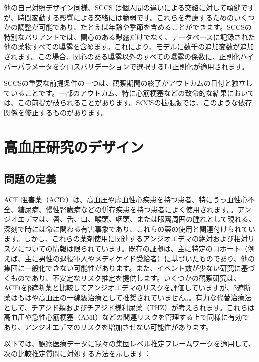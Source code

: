\documentclass[
  11pt]{book}
\theoremstyle{definition}
\theoremstyle{definition}
\theoremstyle{definition}
\theoremstyle{definition}
\theoremstyle{remark}
\begin{document}
他の自己対照デザイン同様、SCCS は個人間の違いによる交絡に対して頑健ですが、時間変動する影響による交絡には脆弱です。これらを考慮するためのいくつかの調整が可能であり、たとえば年齢や季節を含めることができます。SCCSの特別なバリアントでは、関心のある曝露だけでなく、データベースに記録された他の薬物すべての曝露を含めます\citep{simpson_2013}。これにより、モデルに数千の追加変数が追加されます。この場合、関心のある曝露以外のすべての曝露の係数に、正則化ハイパーパラメータをクロスバリデーションで選択するL1正則化が適用されます。

SCCSの重要な前提条件の一つは、観察期間の終了がアウトカムの日付と独立していることです。一部のアウトカム、特に心筋梗塞などの致命的な結果においては、この前提が破られることがあります。SCCSの拡張版では、このような依存関係を修正するものがあります\citep{farrington_2011}。

\section{高血圧研究のデザイン}\label{ux9ad8ux8840ux5727ux7814ux7a76ux306eux30c7ux30b6ux30a4ux30f3}

\subsection{問題の定義}\label{ux554fux984cux306eux5b9aux7fa9-1}

ACE 阻害薬（ACEi）は、高血圧や虚血性心疾患を持つ患者、特にうっ血性心不全、糖尿病、慢性腎臓病などの併存疾患を持つ患者によく使用されます。\citep{zaman_2002}。アンジオエデマは、唇、舌、口、喉頭、咽頭、または眼窩周囲の腫れとして現れる、深刻で時には命に関わる有害事象であり、これらの薬の使用と関連付けられています。\citep{sabroe_1997}しかし、これらの薬剤使用に関連するアンジオエデマの絶対および相対リスクについての情報は限られています。既存の証拠は、主に特定のコホート（例えば、主に男性の退役軍人やメディケイド受給者）に基づいたものであり、他の集団に一般化できない可能性があります。また、イベント数が少ない研究に基づくものであり、不安定なリスク推定を提供します。\citep{powers_2012}いくつかの観察研究は、ACEiをβ遮断薬と比較してアンジオエデマのリスクを評価しています\citep{magid_2010, toh_2012}が、β遮断薬はもはや高血圧の一線級治療として推奨されていません。\citep{whelton_2018}。有力な代替治療法として、チアジド類およびチアジド様利尿薬（THZ）が考えられます。これらは高血圧や急性心筋梗塞（AMI）などの関連リスクを管理する上で同様に有効であり、アンジオエデマのリスクを増加させない可能性があります。

以下では、観察医療データに我々の集団レベル推定フレームワークを適用して、次の比較推定質問に対処する方法を示します：
\end{document}

